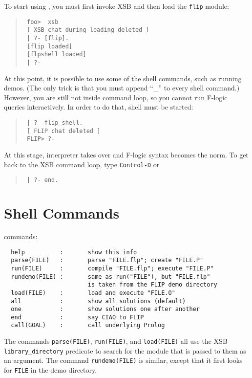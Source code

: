 To start using \FLIP, you must first invoke XSB and then load the {\tt flip} 
module:
\begin{quote}
  \tt
foo>~~xsb  \\
\tt
[ XSB chat during loading deleted ]\\
\tt
| ?- [flip].\\
\tt
[flip loaded]\\
\tt
[flpshell loaded]\\
\tt
| ?-
\end{quote}
At this point, it is possible to use some of the \FLIP shell commands, such as
running demos. (The only trick is that you must append ``\_'' to every \FLIP
shell command.) However, you are still not inside \FLIP command loop, so you 
cannot run F-logic queries interactively. In order to do that, \FLIP shell
must be started:
\begin{quote}
  \tt
| ?- flip\_shell.  \\
 \tt
[ FLIP chat deleted ] \\
 \tt
FLIP> ?-
\end{quote}

At this stage, \FLIP interpreter takes over and F-logic syntax becomes the
norm. To get back to the XSB command loop, type {\tt Control-D} or 
\begin{quote}
  \tt
| ?- end.  
\end{quote}


\section{\FLIP Shell Commands}

\FLIP commands:
\begin{verbatim}
  help          :       show this info
  parse(FILE)   :       parse "FILE.flp"; create "FILE.P"
  run(FILE)     :       compile "FILE.flp"; execute "FILE.P"
  rundemo(FILE) :       same as run("FILE"), but "FILE.flp"
                        is taken from the FLIP demo directory
  load(FILE)    :       load and execute "FILE.O"
  all           :       show all solutions (default)
  one           :       show solutions one after another
  end           :       say CIAO to FLIP
  call(GOAL)    :       call underlying Prolog
\end{verbatim}

The commands {\tt parse(FILE)}, {\tt run(FILE)}, and {\tt load(FILE)} all
use the XSB {\tt library\_directory} predicate to search for the module
that is passed to them as an argument. The command {\tt rundemo(FILE)} is
similar, except that it first looks for {\tt FILE} in the \FLIP demo
directory. 


